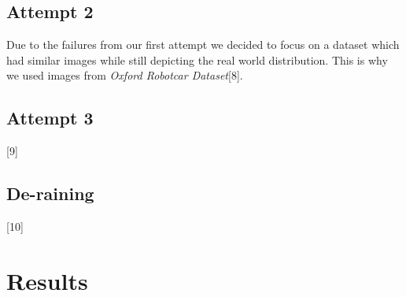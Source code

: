 \documentclass{article}
\begin{document}
\subsection{Attempt 2}

Due to the failures from our first attempt we decided to focus on a dataset which had similar images while still depicting the real world distribution. This is why we used images from \textit{Oxford Robotcar Dataset}[8]. 

\subsection{Attempt 3}

[9]


\subsection{De-raining}

[10]


\section{Results}
\end{document}
